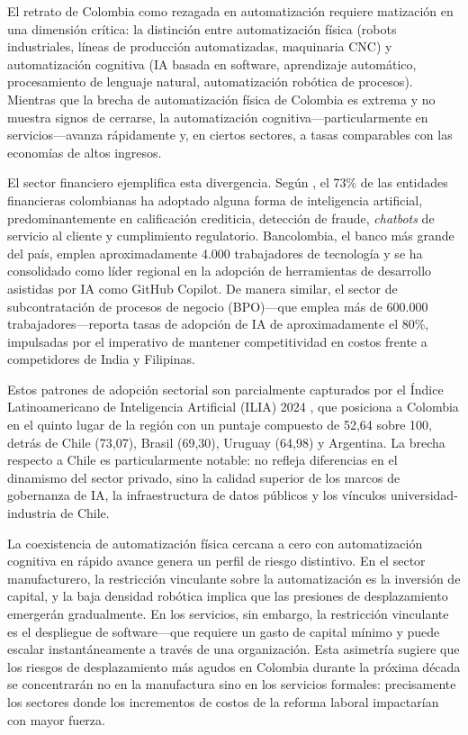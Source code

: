 \documentclass{article}
\begin{document}
El retrato de Colombia como rezagada en automatizaci\'on requiere matizaci\'on en una dimensi\'on cr\'itica: la distinci\'on entre automatizaci\'on f\'isica (robots industriales, l\'ineas de producci\'on automatizadas, maquinaria CNC) y automatizaci\'on cognitiva (IA basada en software, aprendizaje autom\'atico, procesamiento de lenguaje natural, automatizaci\'on rob\'otica de procesos). Mientras que la brecha de automatizaci\'on f\'isica de Colombia es extrema y no muestra signos de cerrarse, la automatizaci\'on cognitiva---particularmente en servicios---avanza r\'apidamente y, en ciertos sectores, a tasas comparables con las econom\'ias de altos ingresos.

El sector financiero ejemplifica esta divergencia. Seg\'un \cite{asobancaria2024}, el 73\% de las entidades financieras colombianas ha adoptado alguna forma de inteligencia artificial, predominantemente en calificaci\'on crediticia, detecci\'on de fraude, \textit{chatbots} de servicio al cliente y cumplimiento regulatorio. Bancolombia, el banco m\'as grande del pa\'is, emplea aproximadamente 4.000 trabajadores de tecnolog\'ia y se ha consolidado como l\'ider regional en la adopci\'on de herramientas de desarrollo asistidas por IA como GitHub Copilot. De manera similar, el sector de subcontrataci\'on de procesos de negocio (BPO)---que emplea m\'as de 600.000 trabajadores---reporta tasas de adopci\'on de IA de aproximadamente el 80\%, impulsadas por el imperativo de mantener competitividad en costos frente a competidores de India y Filipinas.

Estos patrones de adopci\'on sectorial son parcialmente capturados por el \'Indice Latinoamericano de Inteligencia Artificial (ILIA) 2024 \cite{ilia2024}, que posiciona a Colombia en el quinto lugar de la regi\'on con un puntaje compuesto de 52,64 sobre 100, detr\'as de Chile (73,07), Brasil (69,30), Uruguay (64,98) y Argentina. La brecha respecto a Chile es particularmente notable: no refleja diferencias en el dinamismo del sector privado, sino la calidad superior de los marcos de gobernanza de IA, la infraestructura de datos p\'ublicos y los v\'inculos universidad-industria de Chile.

La coexistencia de automatizaci\'on f\'isica cercana a cero con automatizaci\'on cognitiva en r\'apido avance genera un perfil de riesgo distintivo. En el sector manufacturero, la restricci\'on vinculante sobre la automatizaci\'on es la inversi\'on de capital, y la baja densidad rob\'otica implica que las presiones de desplazamiento emerger\'an gradualmente. En los servicios, sin embargo, la restricci\'on vinculante es el despliegue de software---que requiere un gasto de capital m\'inimo y puede escalar instant\'aneamente a trav\'es de una organizaci\'on. Esta asimetr\'ia sugiere que los riesgos de desplazamiento m\'as agudos en Colombia durante la pr\'oxima d\'ecada se concentrar\'an no en la manufactura sino en los servicios formales: precisamente los sectores donde los incrementos de costos de la reforma laboral impactar\'ian con mayor fuerza.
\end{document}
